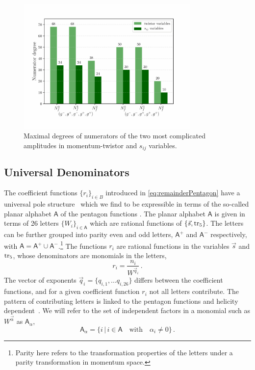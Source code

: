 \begin{figure}[ht]
  \centering
  \includegraphics[width = 0.8\textwidth]{plots/twistorXsijs_comparison.pdf}
  \caption{
    Maximal degrees of numerators of the two most complicated amplitudes in momentum-twistor and $s_{ij}$ variables.
  }
  \label{fig:degrees-twXsij}
\end{figure}


\subsection{Universal Denominators}

The coefficient functions $\{r_i\}_{i\in B}$ introduced in
\cref{eq:remainderPentagon}  have a universal pole 
structure~\cite{Abreu:2018zmy,Abreu:2019odu} which we find to be expressible in terms of
the so-called planar alphabet $\mathsf{A}$ of the pentagon functions \cite{Gehrmann:2018yef}.
The planar alphabet $\mathsf{A}$ is given in terms
of 26 letters $\{W_i\}_{i\in \mathsf{A}}$ which are rational functions of $\{\vec{s},\operatorname{tr_5}\}$.
The letters can be further grouped into parity even and odd letters, 
$\mathsf{A}^+$ and $\mathsf{A}^-$ respectively, with $\mathsf{A}=\mathsf{A}^+\cup \mathsf{A}^-$.\footnote{Parity here refers to  
  the transformation properties of the letters under a parity transformation in 
momentum space.}
The functions $r_i$ are rational functions in the variables ${\vec s}$ and $\operatorname{tr_5}$,  
whose denominators are monomials in the letters,
\begin{equation}
    r_i = \frac{n_{i}}{ W^{\vec q_i}}\,.
    \label{eq:letterDecomposition}
\end{equation}
The vector of exponents $\vec q_i=\{q_{i,1}, ... q_{i,26}\}$ 
differs between the coefficient functions, and for a given
coefficient function $r_i$ not all letters contribute. The pattern of
contributing letters is linked to the pentagon functions and helicity
dependent~\cite{Abreu:2018zmy,Abreu:2019odu}. 
We will refer to the set of 
independent factors in a monomial such as $W^{\vec\alpha}$ as $\mathsf{A}_\alpha$,
\begin{equation}\label{eq:A_alp}
		\mathsf{A}_\alpha = \{ i\,|\, i \in \mathsf{A} \quad \mbox{with} \quad \alpha_i\neq 0 \} \,.
\end{equation}

